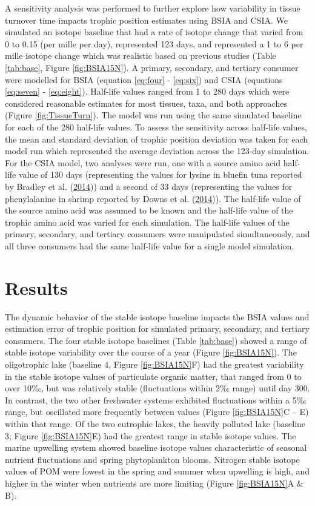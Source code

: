 \documentclass [11pt, proquest] {uwthesis}[2015/03/03]
\begin{document}
A sensitivity analysis was performed to further explore how variability
in tissue turnover time impacts trophic position estimates using BSIA
and CSIA. We simulated an isotope baseline that had a rate of isotope
change that varied from 0 to 0.15 (per mille per day), represented 123
days, and represented a 1 to 6 per mille isotope change which was
realistic based on previous studies (Table \ref{tab:base}, Figure
\ref{fig:BSIA15N}). A primary, secondary, and tertiary consumer were
modelled for BSIA (equation \eqref{eq:four} - \eqref{eq:six}) and CSIA
(equations \eqref{eq:seven} - \eqref{eq:eight}). Half-life values ranged
from 1 to 280 days which were considered reasonable estimates for most
tissues, taxa, and both approaches (Figure \ref{fig:TissueTurn}). The
model was run using the same simulated baseline for each of the 280
half-life values. To assess the sensitivity across half-life values, the
mean and standard deviation of trophic position deviation was taken for
each model run which represented the average deviation across the
123-day simulation. For the CSIA model, two analyses were run, one with
a source amino acid half-life value of 130 days (representing the values
for lysine in bluefin tuna reported by Bradley et al.
(\protect\hyperlink{ref-Bradley2014}{2014})) and a second of 33 days
(representing the values for phenylalanine in shrimp reported by Downs
et al. (\protect\hyperlink{ref-Downs2014}{2014})). The half-life value
of the source amino acid was assumed to be known and the half-life value
of the trophic amino acid was varied for each simulation. The half-life
values of the primary, secondary, and tertiary consumers were
manipulated simultaneously, and all three consumers had the same
half-life value for a single model simulation.

\section{Results}\label{results-4}

The dynamic behavior of the stable isotope baseline impacts the BSIA
values and estimation error of trophic position for simulated primary,
secondary, and tertiary consumers. The four stable isotope baselines
(Table \ref{tab:base}) showed a range of stable isotope variability over
the course of a year (Figure \ref{fig:BSIA15N}). The oligotrophic lake
(baseline 4, Figure \ref{fig:BSIA15N}F) had the greatest variability in
the stable isotope values of particulate organic matter, that ranged
from 0 to over 10‰, but was relatively stable (fluctuations within 2‰
range) until day 300. In contrast, the two other freshwater systems
exhibited fluctuations within a 5‰ range, but oscillated more frequently
between values (Figure \ref{fig:BSIA15N}C -- E) within that range. Of
the two eutrophic lakes, the heavily polluted lake (baseline 3; Figure
\ref{fig:BSIA15N}E) had the greatest range in stable isotope values. The
marine upwelling system showed baseline isotope values characteristic of
seasonal nutrient fluctuations and spring phytoplankton blooms. Nitrogen
stable isotope values of POM were lowest in the spring and summer when
upwelling is high, and higher in the winter when nutrients are more
limiting (Figure \ref{fig:BSIA15N}A \& B).
\end{document}
